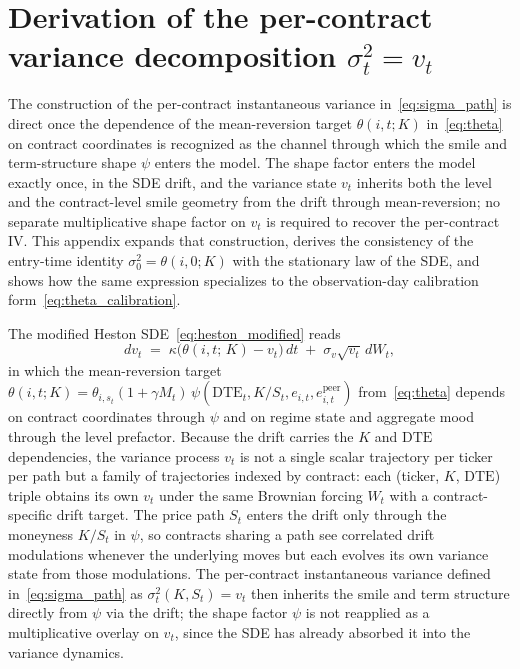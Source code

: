 \section{Derivation of the per-contract variance decomposition $\sigma_t^2 = v_t$}\label{sec:supp_sigma_decomp}

The construction of the per-contract instantaneous variance in~\eqref{eq:sigma_path} is direct once the dependence of the mean-reversion target $\theta(i,t;K)$ in~\eqref{eq:theta} on contract coordinates is recognized as the channel through which the smile and term-structure shape $\psi$ enters the model. The shape factor enters the model exactly once, in the SDE drift, and the variance state $v_t$ inherits both the level and the contract-level smile geometry from the drift through mean-reversion; no separate multiplicative shape factor on $v_t$ is required to recover the per-contract IV. This appendix expands that construction, derives the consistency of the entry-time identity $\sigma_0^2 = \theta(i,0;K)$ with the stationary law of the SDE, and shows how the same expression specializes to the observation-day calibration form~\eqref{eq:theta_calibration}.

The modified Heston SDE~\eqref{eq:heston_modified} reads
\begin{equation}\label{eq:level_sde}
    dv_t \;=\; \kappa\bigl(\theta(i,t;\,K) - v_t\bigr)\,dt \;+\; \sigma_v\sqrt{v_t}\,dW_t,
\end{equation}
in which the mean-reversion target $\theta(i,t;K) = \theta_{i,s_t}(1+\gamma M_t)\,\psi(\mathrm{DTE}_t, K/S_t, e_{i,t}, e^{\text{peer}}_{i,t})$ from~\eqref{eq:theta} depends on contract coordinates through $\psi$ and on regime state and aggregate mood through the level prefactor. Because the drift carries the $K$ and $\mathrm{DTE}$ dependencies, the variance process $v_t$ is not a single scalar trajectory per ticker per path but a family of trajectories indexed by contract: each (ticker, $K$, $\mathrm{DTE}$) triple obtains its own $v_t$ under the same Brownian forcing $W_t$ with a contract-specific drift target. The price path $S_t$ enters the drift only through the moneyness $K/S_t$ in $\psi$, so contracts sharing a path see correlated drift modulations whenever the underlying moves but each evolves its own variance state from those modulations. The per-contract instantaneous variance defined in~\eqref{eq:sigma_path} as $\sigma_t^2(K, S_t) = v_t$ then inherits the smile and term structure directly from $\psi$ via the drift; the shape factor $\psi$ is not reapplied as a multiplicative overlay on $v_t$, since the SDE has already absorbed it into the variance dynamics.

